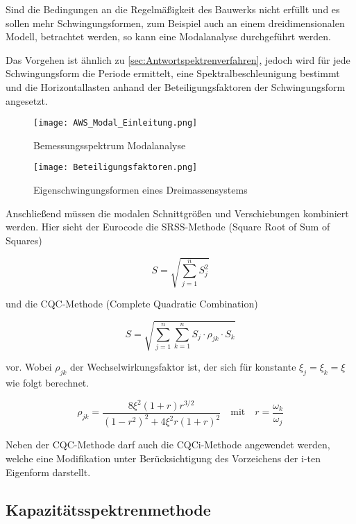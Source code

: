 Sind die Bedingungen an die Regelmäßigkeit des Bauwerks nicht erfüllt und es sollen mehr Schwingungsformen, zum Beispiel auch an einem dreidimensionalen Modell, betrachtet werden, so kann eine Modalanalyse durchgeführt werden.

Das Vorgehen ist ähnlich zu \cref{sec:Antwortspektrenverfahren}, jedoch wird für jede Schwingungsform die Periode ermittelt, eine Spektralbeschleunigung bestimmt und die Horizontallasten anhand der Beteiligungsfaktoren der Schwingungsform angesetzt.

\begin{figure}[H]
    \centering
    \texttt{[image: AWS\_Modal\_Einleitung.png]}
    \caption{Bemessungsspektrum Modalanalyse}
\end{figure}

\begin{figure}[H]
    \centering
    \texttt{[image: Beteiligungsfaktoren.png]}
    \caption{Eigenschwingungsformen eines Dreimassensystems \cite{Pocanschi}}
\end{figure}

Anschließend müssen die modalen Schnittgrößen und Verschiebungen kombiniert werden. Hier sieht der Eurocode die SRSS-Methode (Square Root of Sum of Squares)

\begin{equation*}
S = \sqrt{\sum_{j=1}^{n}S_j^2}
\end{equation*}

und die CQC-Methode (Complete Quadratic Combination)

\begin{equation*}
S = \sqrt{\sum_{j=1}^{n}\sum_{k=1}^{n} S_j \cdot \rho_{jk} \cdot S_k}
\end{equation*}

vor. Wobei $\rho_{jk}$ der Wechselwirkungsfaktor ist, der sich für konstante $\xi_j = \xi_k = \xi$ wie folgt berechnet.

\begin{equation*}
\rho_{jk} = \frac{8 \xi^2 (1 + r) r^{3/2}}{(1 - r^2)^2 + 4 \xi^2 r ( 1 + r)^2}
\quad\mathrm{mit}\quad 
r = \frac{\omega_k}{\omega_j}
\end{equation*}

Neben der CQC-Methode darf auch die CQCi-Methode angewendet werden, welche eine Modifikation unter Berücksichtigung des Vorzeichens der i-ten Eigenform darstellt.

\pagebreak

\subsection{Kapazitätsspektrenmethode}
\label{sec:Kapazitaetsspektrenmethode}

